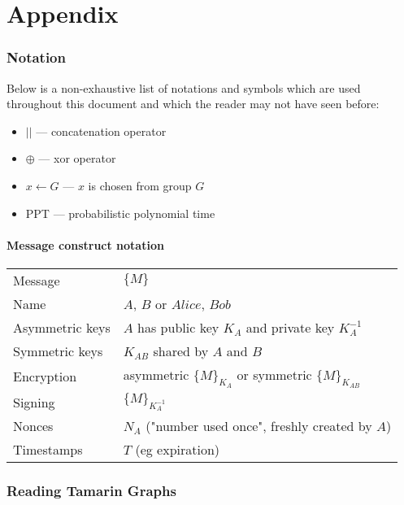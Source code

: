 %
%
\appendix

\part{Appendix}

\section{Notation}

Below is a non-exhaustive list of notations and symbols which are used throughout this document and which the reader may not have seen before:

\begin{itemize}
    \item $||$ --- concatenation operator
    \item $\oplus$ --- xor operator
    \item $x \leftarrow G$ --- $x$ is chosen from group $G$
    \item PPT --- probabilistic polynomial time
\end{itemize}


\subsection{Message construct notation}

\begin{table}[h]
\centering
\begin{tabular}{ll}
Message & $\{ M \}$ \\
Name & $A$, $B$ or $Alice$, $Bob$ \\
Asymmetric keys &  $A$ has public key $K_A$ and private key $K_A^{-1}$ \\
Symmetric keys & $K_{AB}$ shared by $A$ and $B$ \\
Encryption &  asymmetric $\{ M \}_{K_A}$ or symmetric $\{ M \}_{K_{AB}}$ \\
Signing &  $\{ M \}_{K_A^{-1}}$\\
Nonces &  $N_A$ ("number used once", freshly created by $A$)\\
Timestamps & $T$ (eg expiration) \\
\end{tabular}
\end{table}

\section{Reading Tamarin Graphs}


